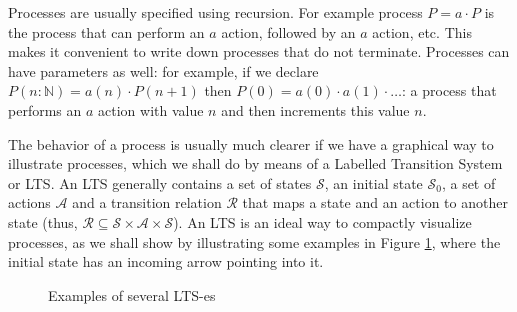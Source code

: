 Processes are usually specified using recursion. For example process $P = a \cdot P$ is the process that can perform an $a$ action, followed by an $a$ action, etc. This makes it convenient to write down processes that do not terminate. Processes can have parameters as well: for example, if we declare $P(n: \mathds{N}) = a(n) \cdot P(n+1)$ then $P(0) = a(0) \cdot a(1) \cdot \dots$: a process that performs an $a$ action with value $n$ and then increments this value $n$.

The behavior of a process is usually much clearer if we have a graphical way to illustrate processes, which we shall do by means of a Labelled Transition System or LTS. An LTS generally contains a set of states $\mathcal{S}$, an initial state $\mathcal{S}_0$, a set of actions $\mathcal{A}$ and a transition relation $\mathcal{R}$ that maps a state and an action to another state (thus, $\mathcal{R} \subseteq \mathcal{S} \times \mathcal{A} \times \mathcal{S}$). An LTS is an ideal way to compactly visualize processes, as we shall show by illustrating some examples in Figure \ref{fig:lpsexample}, where the initial state has an incoming arrow pointing into it.

\begin{figure}[h]
 \centering
 \caption{\label{fig:lpsexample} Examples of several LTS-es}
\end{figure}


